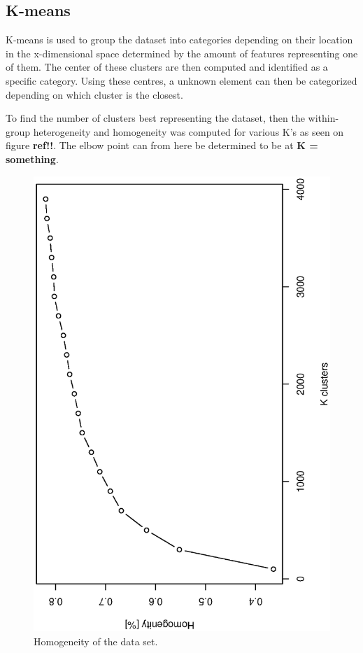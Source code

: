 \subsection{K-means}
K-means is used to group the dataset into categories depending on their location in the x-dimensional space determined by the amount of features representing one of them.
The center of these clusters are then computed and identified as a specific category.
Using these centres, a unknown element can then be categorized depending on which cluster is the closest.

To find the number of clusters best representing the dataset, then the within-group heterogeneity and homogeneity was computed for various K's as seen on figure \textbf{ref!!}.
The elbow point can from here be determined to be at \textbf{K = something}.

\begin{figure}
\centering
\includegraphics[width=\textwidth]{graphics/homogenity}
\caption{Homogeneity of the data set.}
\label{fig:homogeneity_kmean}
\end{figure}


